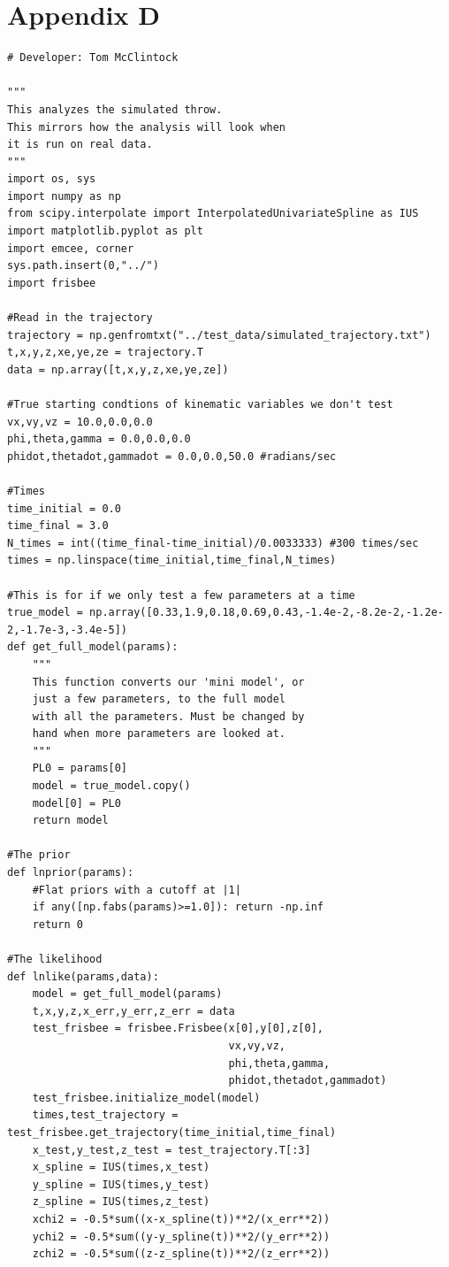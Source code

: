 \documentclass[a4paper,12pt, oneside]{article}
\begin{document}
\section*{Appendix D}
\begin{verbatim}
# Developer: Tom McClintock

"""
This analyzes the simulated throw.
This mirrors how the analysis will look when
it is run on real data.
"""
import os, sys
import numpy as np
from scipy.interpolate import InterpolatedUnivariateSpline as IUS
import matplotlib.pyplot as plt
import emcee, corner
sys.path.insert(0,"../")
import frisbee

#Read in the trajectory
trajectory = np.genfromtxt("../test_data/simulated_trajectory.txt")
t,x,y,z,xe,ye,ze = trajectory.T
data = np.array([t,x,y,z,xe,ye,ze])

#True starting condtions of kinematic variables we don't test
vx,vy,vz = 10.0,0.0,0.0
phi,theta,gamma = 0.0,0.0,0.0
phidot,thetadot,gammadot = 0.0,0.0,50.0 #radians/sec

#Times
time_initial = 0.0
time_final = 3.0
N_times = int((time_final-time_initial)/0.0033333) #300 times/sec
times = np.linspace(time_initial,time_final,N_times)

#This is for if we only test a few parameters at a time
true_model = np.array([0.33,1.9,0.18,0.69,0.43,-1.4e-2,-8.2e-2,-1.2e-2,-1.7e-3,-3.4e-5])
def get_full_model(params):
    """
    This function converts our 'mini model', or
    just a few parameters, to the full model
    with all the parameters. Must be changed by
    hand when more parameters are looked at.
    """
    PL0 = params[0]
    model = true_model.copy()
    model[0] = PL0
    return model

#The prior
def lnprior(params):
    #Flat priors with a cutoff at |1|
    if any([np.fabs(params)>=1.0]): return -np.inf
    return 0

#The likelihood
def lnlike(params,data):
    model = get_full_model(params)
    t,x,y,z,x_err,y_err,z_err = data
    test_frisbee = frisbee.Frisbee(x[0],y[0],z[0],
                                   vx,vy,vz,
                                   phi,theta,gamma,
                                   phidot,thetadot,gammadot)
    test_frisbee.initialize_model(model)
    times,test_trajectory = test_frisbee.get_trajectory(time_initial,time_final)
    x_test,y_test,z_test = test_trajectory.T[:3]
    x_spline = IUS(times,x_test)
    y_spline = IUS(times,y_test)
    z_spline = IUS(times,z_test)
    xchi2 = -0.5*sum((x-x_spline(t))**2/(x_err**2))
    ychi2 = -0.5*sum((y-y_spline(t))**2/(y_err**2))
    zchi2 = -0.5*sum((z-z_spline(t))**2/(z_err**2))


\end{verbatim}
\end{document}
